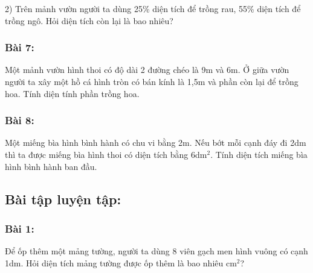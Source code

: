 \documentclass[11pt]{article}
\begin{document}
2) Trên mảnh vườn người ta dùng 25\% diện tích để trồng rau, 55\% diện tích để trồng ngô. Hỏi diện tích còn lại là bao nhiêu?

\subsubsection*{Bài 7:} Một mảnh vườn hình thoi có độ dài 2 đường chéo là 9m và 6m. Ở giữa vườn người ta xây một hồ cá hình tròn có bán kính là 1,5m và phần còn lại để trồng hoa. Tính diện tính phần trồng hoa.

\subsubsection*{Bài 8:} Một miếng bìa hình bình hành có chu vi bằng 2m. Nếu bớt mỗi cạnh đáy đi 2dm thì ta được miếng bìa hình thoi có diện tích bằng 6dm$^2$. Tính diện tích miếng bìa hình bình hành ban đầu.

\begin{center}
\end{center}

\subsection*{Bài tập luyện tập:}

\subsubsection*{Bài 1:} Để ốp thêm một mảng tường, người ta dùng 8 viên gạch men hình vuông có cạnh 1dm. Hỏi diện tích mảng tường được ốp thêm là bao nhiêu cm$^2$?
\end{document}
